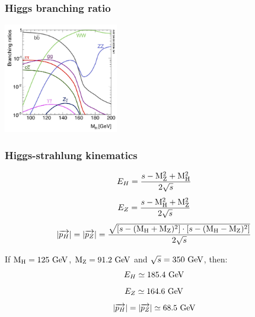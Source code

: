 \documentclass{beamer}
\begin{document}
  
  \begin{frame}[plain]
    \frametitle{Higgs branching ratio}

    \begin{center}
      \includegraphics[width = 5cm]{Pictures/higgsbr.jpg}
    \end{center}
  \end{frame}


  \begin{frame}[plain]
    \frametitle{Higgs-strahlung kinematics}

    \[ E_H = \frac{s - \rm{M}_Z^2 + \rm{M}_H^2}{2\sqrt{s}} \]
    \[ E_Z = \frac{s - \rm{M}_H^2 + \rm{M}_Z^2}{2\sqrt{s}} \]
    \[ | \overrightarrow{p_H} | = | \overrightarrow{p_Z} | = \frac{\sqrt{\left[ s - (\rm{M}_H + \rm{M}_Z)^2 \right] \cdot \left[s - (\rm{M}_H - \rm{M}_Z)^2 \right]}}{2\sqrt{s}} \]

    If $\rm{M}_H = 125~\rm{GeV}$, $\rm{M}_Z = 91.2~\rm{GeV}$ and $\sqrt{s} = 350~\rm{GeV}$, then:
    \[ E_H \simeq 185.4~\rm{GeV} \]
    \[ E_Z \simeq 164.6~\rm{GeV} \]
    \[  | \overrightarrow{p_H} | = | \overrightarrow{p_Z} | \simeq 68.5~\rm{GeV}\]

  \end{frame}

\end{document}
